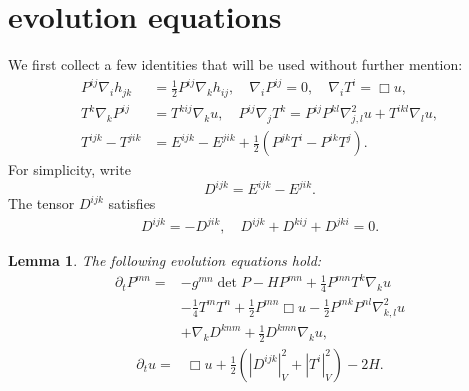 \documentclass{amsart}
\newtheorem{lemma}[theorem]{Lemma}
\theoremstyle{definition}
\theoremstyle{remark}
\numberwithin{equation}{section}
\begin{document}
\section{evolution equations}
We first collect a few identities that will be used without further mention:
\begin{align}\label{equ: important1}
P^{ij}\nabla_ih_{jk}&=\frac{1}{2}P^{ij}\nabla_kh_{ij},\quad
\nabla_iP^{ij}=0,\quad \nabla_iT^i=\Box u,\\
T^k\nabla_kP^{ij}&=T^{kij}\nabla_ku,\quad P^{ij}\nabla_j T^k=P^{ij}P^{kl}\nabla^2_{j,l}u+T^{ikl}\nabla_lu,\\
T^{ijk}-T^{jik}&=E^{ijk}-E^{jik}+\frac{1}{2}\left(P^{jk}T^i-P^{ik}T^j\right).
\end{align}
For simplicity, write
\[D^{ijk}=E^{ijk}-E^{jik}.\]
The tensor $D^{ijk}$ satisfies
\begin{align*}
D^{ijk}=-D^{jik},\quad D^{ijk}+D^{kij}+D^{jki}=0.
\end{align*}
\begin{lemma}\label{ev u}
The following evolution equations hold:
\begin{align*}
\partial_tP^{mn}
=&-g^{mn}\det P-HP^{mn}+\frac{1}{4}P^{mn}T^k\nabla_ku\\
&-\frac{1}{4}T^mT^n+\frac{1}{2}P^{mn}\Box u-\frac{1}{2}P^{mk}P^{nl}\nabla^2_{k,l}u\\
&+\nabla_kD^{knm}+\frac{1}{2}D^{kmn}\nabla_ku,
\end{align*}
\begin{align*}
\partial_t u=&\Box u+\frac{1}{2}\left(\left|D^{ijk}\right|^2_V+\left|T^i\right|_V^2\right)-2H.
\end{align*}
\end{lemma}
\end{document}
